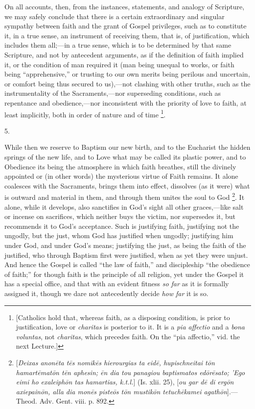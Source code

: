 On all accounts, then, from the instances, statements, and analogy
of Scripture, we may safely conclude that there is a certain
extraordinary and singular sympathy between faith and the grant of
Gospel privileges, such as to constitute it, in a true sense, an
instrument of receiving them, that is, of justification, which
includes them all;—in a true sense, which is to be determined by
that same Scripture, and not by antecedent arguments, as if the
definition of faith implied it, or the condition of man required it
(man being unequal to works, or faith being ``apprehensive,'' or
trusting to our own merits being perilous and uncertain, or comfort
being thus secured to us),—not clashing with other truths, such as
the instrumentality of the Sacraments,—nor superseding conditions,
such as repentance and obedience,—nor inconsistent with the priority
of love to faith, at least implicitly, both in order of nature and of
time \footnote{[Catholics hold
that, whereas faith, as a disposing condition, is prior to
justification, love or \emph{charitas} is posterior to it. It is a \emph{pia
affectio} and a \emph{bona voluntas}, not \emph{charitas}, which
precedes faith. On the ``pia affectio,'' vid. the next
Lecture.]}.

5.

While then we reserve to Baptism our new birth, and to the
Eucharist the hidden springs of the new life, and to Love what may be
called its plastic power, and to Obedience its being the atmosphere in
which faith breathes, still the divinely appointed or (in other words)
the mysterious virtue of Faith remains. It alone coalesces with
the Sacraments, brings them into effect, dissolves (as it were) what
is outward and material in them, and through them unites the soul to
God \footnote{[\emph{Deixas anon\={e}ta
t\={e}s nomik\={e}s hierourgias ta eid\={e}, hupischneitai t\={o}n
hamart\={e}mat\={o}n t\={e}n aphesin; \={e}n dia tou
panagiou baptismatos ed\={o}r\={e}sato; 'Ego eimi ho exaleiph\={o}n
tas hamartias, k.t.l.}] (Is. xlii. 25), [\emph{ou gar d\={e} di erg\={o}n
axiepain\={o}n, alla dia mon\={e}s piste\={o}s t\={o}n
mustik\={o}n tetuch\={e}kamei agath\={o}n}].—Theod. Adv. Gent.
viii. p. 892.}. It alone, while it
develops, also sanctifies in God's sight all other graces,—like salt
or incense on sacrifices, which neither buys the victim, nor
supersedes it, but recommends it to God's acceptance. Such is
justifying faith, justifying not the ungodly, but the just, whom God
has justified when ungodly; justifying him under God, and under God's
means; justifying the just, as being the faith of the justified, who
through Baptism first were justified, when as yet they were unjust.
And hence the Gospel is called ``the law of faith,'' and
discipleship ``the obedience of faith;'' for though faith is
the principle of all religion, yet under the Gospel it has a special
office, and that with an evident fitness \emph{so far} as it is
formally assigned it, though we dare not antecedently decide \emph{how
far} it is so.


